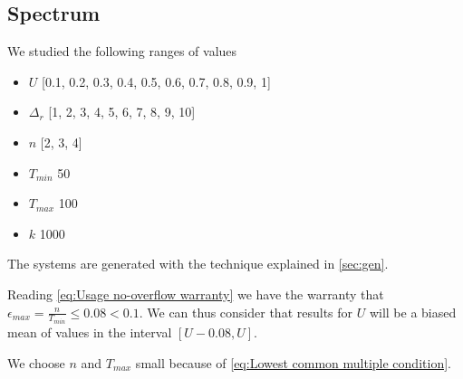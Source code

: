 \subsection{Spectrum}

We studied the following ranges of values
\begin{itemize}
	\item{$U$} [0.1, 0.2, 0.3, 0.4, 0.5, 0.6, 0.7, 0.8, 0.9, 1]
	\item{$\Delta_r$} [1, 2, 3, 4, 5, 6, 7, 8, 9, 10]
	\item{$n$} [2, 3, 4]
	\item{$T_{min}$} 50
	\item{$T_{max}$} 100
	\item{$k$} 1000
\end{itemize}

The systems are generated with the technique explained in \ref{sec:gen}.

Reading \ref{eq:Usage no-overflow warranty} we have the warranty that $\epsilon_{max} = \frac{n}{T_{min}} \leq 0.08 < 0.1$.
We can thus consider that results for $U$ will be a biased mean of values in the interval $[U-0.08, U]$.

We choose $n$ and $T_{max}$ small because of \ref{eq:Lowest common multiple condition}.